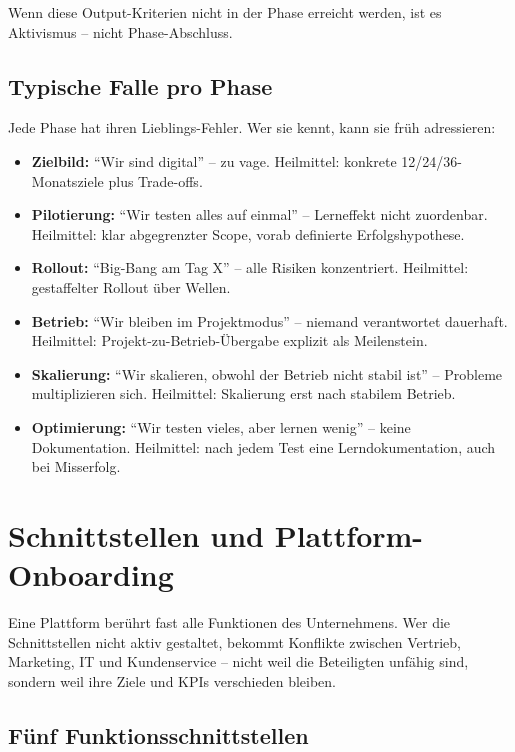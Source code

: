\documentclass[11pt,a4paper,oneside]{article}
\begin{document}
\medskip

\noindent Wenn diese Output-Kriterien nicht in der Phase erreicht werden, ist es Aktivismus -- nicht Phase-Abschluss.

\subsection{Typische Falle pro Phase}

Jede Phase hat ihren Lieblings-Fehler. Wer sie kennt, kann sie früh adressieren:

\begin{itemize}
  \item \textbf{Zielbild:} ``Wir sind digital'' -- zu vage. Heilmittel: konkrete 12/24/36-Monatsziele plus Trade-offs.
  \item \textbf{Pilotierung:} ``Wir testen alles auf einmal'' -- Lerneffekt nicht zuordenbar. Heilmittel: klar abgegrenzter Scope, vorab definierte Erfolgshypothese.
  \item \textbf{Rollout:} ``Big-Bang am Tag X'' -- alle Risiken konzentriert. Heilmittel: gestaffelter Rollout über Wellen.
  \item \textbf{Betrieb:} ``Wir bleiben im Projektmodus'' -- niemand verantwortet dauerhaft. Heilmittel: Projekt-zu-Betrieb-Übergabe explizit als Meilenstein.
  \item \textbf{Skalierung:} ``Wir skalieren, obwohl der Betrieb nicht stabil ist'' -- Probleme multiplizieren sich. Heilmittel: Skalierung erst nach stabilem Betrieb.
  \item \textbf{Optimierung:} ``Wir testen vieles, aber lernen wenig'' -- keine Dokumentation. Heilmittel: nach jedem Test eine Lerndokumentation, auch bei Misserfolg.
\end{itemize}

\section{Schnittstellen und Plattform-Onboarding}

Eine Plattform berührt fast alle Funktionen des Unternehmens. Wer die Schnittstellen nicht aktiv gestaltet, bekommt Konflikte zwischen Vertrieb, Marketing, IT und Kundenservice -- nicht weil die Beteiligten unfähig sind, sondern weil ihre Ziele und KPIs verschieden bleiben.

\subsection{Fünf Funktionsschnittstellen}
\end{document}
